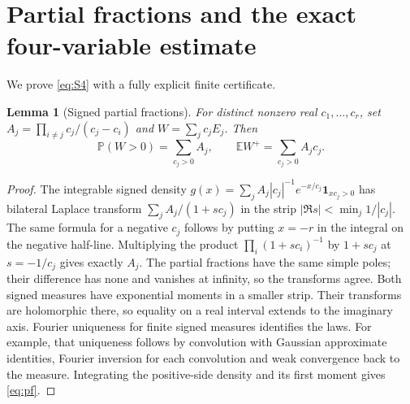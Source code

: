 \documentclass[11pt]{article}
\newtheorem{lemma}[theorem]{Lemma}
\theoremstyle{remark}\newtheorem{remark}[theorem]{Remark}
\newcommand{\E}{\mathbb E}
\newcommand{\Prob}{\mathbb P}
\numberwithin{equation}{section}
\begin{document}
\section{Partial fractions and the exact four-variable estimate}\label{sec:certificate}
We prove \eqref{eq:S4} with a fully explicit finite certificate.
\begin{lemma}[Signed partial fractions]\label{lem:pf}
For distinct nonzero real $c_1,\ldots,c_r$, set
$A_j=\prod_{i\ne j}c_j/(c_j-c_i)$ and $W=\sum_jc_jE_j$. Then
\begin{equation}\label{eq:pf}
 \Prob(W>0)=\sum_{c_j>0}A_j,\qquad
 \E W^+=\sum_{c_j>0}A_jc_j.
\end{equation}
\end{lemma}
\begin{proof}
The integrable signed density
$g(x)=\sum_j A_j|c_j|^{-1}e^{-x/c_j}\mathbf1_{xc_j>0}$ has bilateral
Laplace transform $\sum_j A_j/(1+sc_j)$ in the strip
$|\Re s|<\min_j1/|c_j|$. The same formula for a negative $c_j$ follows
by putting $x=-r$ in the integral on the negative half-line.
Multiplying the product $\prod_i(1+sc_i)^{-1}$ by $1+sc_j$ at
$s=-1/c_j$ gives exactly $A_j$. The partial fractions have the same
simple poles; their difference has none and vanishes at infinity,
so the transforms agree. Both signed measures have exponential moments
in a smaller strip. Their transforms are holomorphic there, so equality
on a real interval extends to the imaginary axis. Fourier uniqueness
for finite signed measures identifies the laws. For example, that
uniqueness follows by convolution with Gaussian approximate identities,
Fourier inversion for each convolution and weak convergence back to
the measure. Integrating the positive-side density and its first moment
gives \eqref{eq:pf}.
\end{proof}
\end{document}
